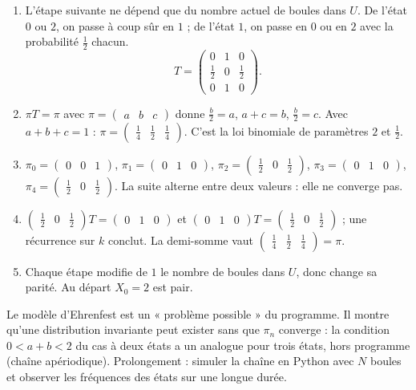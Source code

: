 \begin{solution}[Problème]
\begin{enumerate}
\item L'étape suivante ne dépend que du nombre actuel de boules dans $U$. De l'état $0$ ou $2$, on passe à coup sûr en $1$ ; de l'état $1$, on passe en $0$ ou en $2$ avec la probabilité $\frac12$ chacun. \[T=\begin{pmatrix}0&1&0\\\frac12&0&\frac12\\0&1&0\end{pmatrix}.\]
\item $\pi T=\pi$ avec $\pi=\begin{pmatrix}a&b&c\end{pmatrix}$ donne $\frac b2=a$, $a+c=b$, $\frac b2=c$. Avec $a+b+c=1$ : $\pi=\begin{pmatrix}\frac14&\frac12&\frac14\end{pmatrix}$. C'est la loi binomiale de paramètres $2$ et $\frac12$.
\item $\pi_0=\begin{pmatrix}0&0&1\end{pmatrix}$, $\pi_1=\begin{pmatrix}0&1&0\end{pmatrix}$, $\pi_2=\begin{pmatrix}\frac12&0&\frac12\end{pmatrix}$, $\pi_3=\begin{pmatrix}0&1&0\end{pmatrix}$, $\pi_4=\begin{pmatrix}\frac12&0&\frac12\end{pmatrix}$. La suite alterne entre deux valeurs : elle ne converge pas.
\item $\begin{pmatrix}\frac12&0&\frac12\end{pmatrix}T=\begin{pmatrix}0&1&0\end{pmatrix}$ et $\begin{pmatrix}0&1&0\end{pmatrix}T=\begin{pmatrix}\frac12&0&\frac12\end{pmatrix}$ ; une récurrence sur $k$ conclut. La demi-somme vaut $\begin{pmatrix}\frac14&\frac12&\frac14\end{pmatrix}=\pi$.
\item Chaque étape modifie de $1$ le nombre de boules dans $U$, donc change sa parité. Au départ $X_0=2$ est pair.
\end{enumerate}
\end{solution}
\begin{teachernote}
Le modèle d'Ehrenfest est un « problème possible » du programme. Il montre qu'une distribution invariante peut exister sans que $\pi_n$ converge : la condition $0<a+b<2$ du cas à deux états a un analogue pour trois états, hors programme (chaîne apériodique). Prolongement : simuler la chaîne en Python avec $N$ boules et observer les fréquences des états sur une longue durée.
\end{teachernote}
